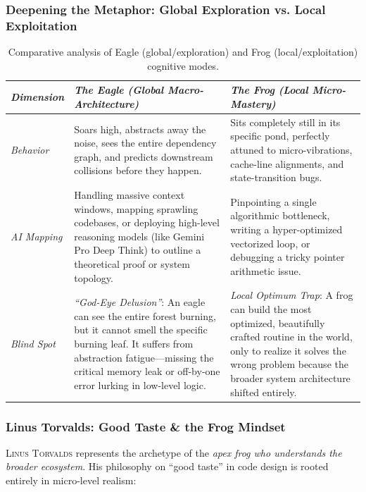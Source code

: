 \documentclass{article}
\begin{document}
\subsubsection{Deepening the Metaphor: Global Exploration vs. Local Exploitation}

\begin{table}[H]
	\centering
	\small
	\begin{tabularx}{\textwidth}{|p{2.5cm}|X|X|}
		\hline
		\emph{Dimension} & \emph{The Eagle (Global Macro-Architecture)} & \emph{The Frog (Local Micro-Mastery)} \\ \hline
		\emph{Behavior} & Soars high, abstracts away the noise, sees the entire dependency graph, and predicts downstream collisions before they happen. & Sits completely still in its specific pond, perfectly attuned to micro-vibrations, cache-line alignments, and state-transition bugs. \\ \hline
		\emph{AI Mapping} & Handling massive context windows, mapping sprawling codebases, or deploying high-level reasoning models (like Gemini Pro Deep Think) to outline a theoretical proof or system topology. & Pinpointing a single algorithmic bottleneck, writing a hyper-optimized vectorized loop, or debugging a tricky pointer arithmetic issue. \\ \hline
		\emph{Blind Spot} & \textit{``God-Eye Delusion''}: An eagle can see the entire forest burning, but it cannot smell the specific burning leaf. It suffers from abstraction fatigue---missing the critical memory leak or off-by-one error lurking in low-level logic. & \textit{Local Optimum Trap}: A frog can build the most optimized, beautifully crafted routine in the world, only to realize it solves the wrong problem because the broader system architecture shifted entirely. \\ \hline
	\end{tabularx}
	\caption{Comparative analysis of Eagle (global/exploration) and Frog (local/exploitation) cognitive modes.}
\end{table}

\subsubsection{Linus Torvalds: Good Taste \& the Frog Mindset}

\textsc{Linus Torvalds} represents the archetype of the \textit{apex frog who understands the broader ecosystem}. His philosophy on ``good taste'' in code design is rooted entirely in micro-level realism:
\end{document}
